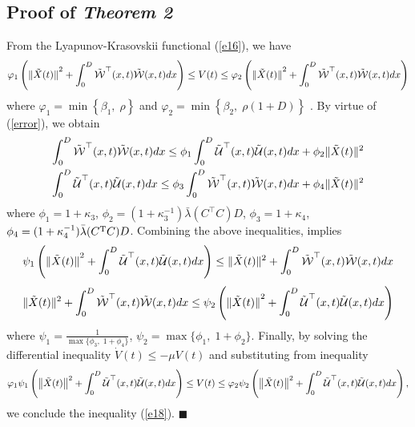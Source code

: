 \documentclass[12pt,draftcls,onecolumn]{IEEEtran}
\newcommand{\carre} {\hfill $\blacksquare$}
\begin{document}
\subsection{Proof of {\it Theorem 2}}
 From the Lyapunov-Krasovskii functional (\ref{e16}), we have
\begin{align*}
{\varphi _1}\left( {{{\| {\tilde X(t)} \|}^2} + \int_0^D {{{\tilde {\cal W}}^{\top} }(x,t)\tilde {\cal W}(x,t)dx} } \right) \le V(t) \le {\varphi _2}\left( {{{\| {\tilde X(t)} \|}^2} + \int_0^D {{{\tilde {\cal W}}^{\top} }(x,t)\tilde {\cal W}(x,t)dx} } \right)
\end{align*}
where $ {\varphi _1} = \min \left\{ {{\beta _1},\;\rho } \right\} $ and $ {\varphi _2} = \min \left\{ {{\beta _2},\;\rho (1 + D)} \right\} $ . By virtue of (\ref{error}), we obtain
\begin{align*}
\int_0^D {{{\tilde {\cal W}}^{\top} }(x,t)\tilde {\cal W}(x,t)dx}  \le {\phi _1}\int_0^D {{{\tilde {\cal U}}^\top}(x,t)\tilde {\cal U}(x,t)dx}  + {\phi _2}{\| {\tilde X(t)} \|^2}\\
\int_0^D {{{\tilde {\cal U}}^\top}(x,t)\tilde {\cal U}(x,t)dx}  \le {\phi _3}\int_0^D {{{\tilde {\cal W}}^{\top} }(x,t)\tilde {\cal W}(x,t)dx}  + {\phi _4}{\| {\tilde X(t)} \|^2}
\end{align*}
where ${\phi _1} = 1 + {\kappa _3}$, ${\phi _2} = (1 + \kappa _3^{ - 1})\bar \lambda ({C^{\top} }C)D $, ${\phi _3} = 1 + {\kappa _4}$, ${\phi _4} = (1 + \kappa _4^{ - 1})\bar \lambda ({C^{\mathop{\rm T}\nolimits} }C)D $. Combining the above inequalities, implies
\[ {\psi _1}\left( {{{\| {\tilde X(t)} \|}^2} + \int_0^D {{{\tilde {\cal U}}^\top}(x,t)\tilde {\cal U}(x,t)dx} } \right) \le {\| {\tilde X(t)} \|^2} + \int_0^D {{{\tilde {\cal W}}^{\top} }(x,t)\tilde {\cal W}(x,t)dx}\]
\[ {\| {\tilde X(t)} \|^2} + \int_0^D {{{\tilde {\cal W}}^{\top} }(x,t)\tilde {\cal W}(x,t)dx}  \le {\psi _2}\left( {{{\| {\tilde X(t)} \|}^2} + \int_0^D {{{\tilde {\cal U}}^\top}(x,t)\tilde {\cal U}(x,t)dx} } \right)
\]
where $ {\psi _1} = \frac{1}{{\max \{ {\phi _3},\;1 + {\phi _4}\} }} $, ${\psi _2} = \max \{ {\phi _1},\;1 + {\phi _2}\} $. Finally, by solving the differential inequality $\dot V(t) \le  - \mu V(t) $ and substituting from inequality
\[{\varphi _1}{\psi _1}\left( {{{\left\| {\tilde X(t)} \right\|}^2} + \int_0^D {{{\tilde {\cal U}}^\top}(x,t)\tilde {\cal U}(x,t)dx} } \right) \le V(t) \le {\varphi _2}{\psi _2}\left( {{{\left\| {\tilde X(t)} \right\|}^2} + \int_0^D {{{\tilde {\cal U}}^\top}(x,t)\tilde {\cal U}(x,t)dx} } \right),\]
we conclude the inequality (\ref{e18}). \carre
\end{document}
